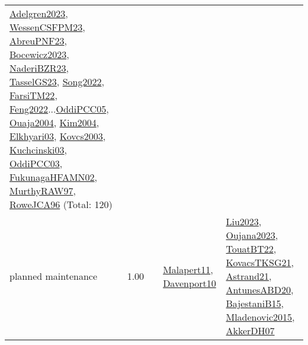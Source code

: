 {\begin{longtable}{p{3cm}r>{\raggedright\arraybackslash}p{6cm}>{\raggedright\arraybackslash}p{6cm}>{\raggedright\arraybackslash}p{8cm}}
\hyperref[detail:Adelgren2023]{Adelgren2023}, \hyperref[detail:WessenCSFPM23]{WessenCSFPM23}, \hyperref[detail:AbreuPNF23]{AbreuPNF23}, \hyperref[detail:Bocewicz2023]{Bocewicz2023}, \hyperref[detail:NaderiBZR23]{NaderiBZR23}, \hyperref[detail:TasselGS23]{TasselGS23}, \hyperref[detail:Song2022]{Song2022}, \hyperref[detail:FarsiTM22]{FarsiTM22}, \hyperref[detail:Feng2022]{Feng2022}...\hyperref[detail:OddiPCC05]{OddiPCC05}, \hyperref[detail:Ouaja2004]{Ouaja2004}, \hyperref[detail:Kim2004]{Kim2004}, \hyperref[detail:Elkhyari03]{Elkhyari03}, \hyperref[detail:Kovcs2003]{Kovcs2003}, \hyperref[detail:Kuchcinski03]{Kuchcinski03}, \hyperref[detail:OddiPCC03]{OddiPCC03}, \hyperref[detail:FukunagaHFAMN02]{FukunagaHFAMN02}, \hyperref[detail:MurthyRAW97]{MurthyRAW97}, \hyperref[detail:RoweJCA96]{RoweJCA96} (Total: 120)\\
\index{planned maintenance}\index{Concepts!planned maintenance}planned maintenance &  1.00 &  & \hyperref[detail:Malapert11]{Malapert11}, \hyperref[detail:Davenport10]{Davenport10} & \hyperref[detail:Liu2023]{Liu2023}, \hyperref[detail:Oujana2023]{Oujana2023}, \hyperref[detail:TouatBT22]{TouatBT22}, \hyperref[detail:KovacsTKSG21]{KovacsTKSG21}, \hyperref[detail:Astrand21]{Astrand21}, \hyperref[detail:AntunesABD20]{AntunesABD20}, \hyperref[detail:BajestaniB15]{BajestaniB15}, \hyperref[detail:Mladenovic2015]{Mladenovic2015}, \hyperref[detail:AkkerDH07]{AkkerDH07}\\

\end{longtable}}
